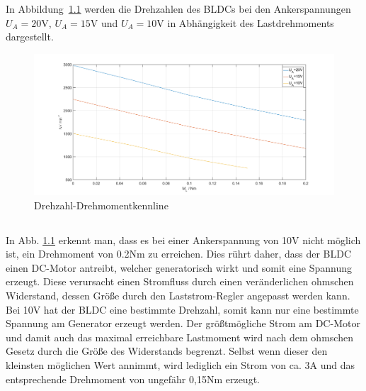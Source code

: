 \chapter{}\label{ex:aufg5}
%
\section{}\label{sec:aufg5a}
%
In Abbildung~\ref{fig:drehzahldrehm} werden die Drehzahlen des BLDCs bei den Ankerspannungen $U_A = 20$V, $U_A = 15$V und $U_A = 10$V in Abhängigkeit des Lastdrehmoments dargestellt.

\begin{figure}[htb]
	\includegraphics[width = \textwidth]{./Bilder/Drehzahldrehmomentkennlinie}
	\caption{Drehzahl-Drehmomentkennline}
	\label{fig:drehzahldrehm}
\end{figure}
%
\section{}\label{sec:aufg5b}
%
In Abb. \ref{fig:drehzahldrehm} erkennt man, dass es bei einer Ankerspannung von 10V nicht möglich ist, ein Drehmoment von 0.2Nm zu erreichen. Dies rührt daher, dass der BLDC einen DC-Motor antreibt, welcher generatorisch wirkt und somit eine Spannung erzeugt. Diese verursacht einen Stromfluss durch einen veränderlichen ohmschen Widerstand, dessen Größe durch den Laststrom-Regler angepasst werden kann. Bei 10V hat der BLDC eine bestimmte Drehzahl, somit kann nur eine bestimmte Spannung am Generator erzeugt werden. Der größtmögliche Strom am DC-Motor und damit auch das maximal erreichbare Lastmoment wird nach dem ohmschen Gesetz durch die Größe des Widerstands begrenzt. Selbst wenn dieser den kleinsten möglichen Wert annimmt, wird lediglich ein Strom von ca. 3A und das entsprechende Drehmoment von ungefähr 0,15Nm erzeugt.